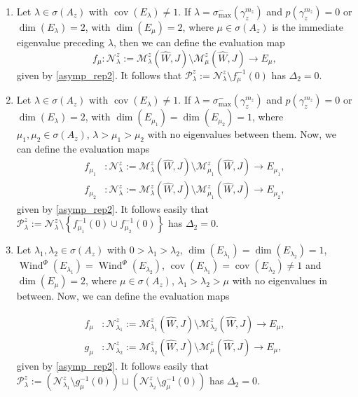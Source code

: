 \documentclass[11pt, a4paper]{amsart}
\newcommand{\cM}{\mathcal{M}}
\newcommand{\cN}{\mathcal{N}}
\newcommand{\cP}{\mathcal{P}}
\DeclareMathOperator{\wind}{Wind}
\DeclareMathOperator{\cov}{cov}
\begin{document}
\begin{enumerate}[topsep=5pt,itemsep=5pt]
    \item Let $\lambda \in \sigma(A_z)$ with $\cov(E_\lambda)\neq 1$. If $\lambda=\sigma_{\max}^{-}(\gamma_z^{m_z})$ and $p(\gamma_z^{m_z})=0$ or $\dim(E_{\lambda})=2$, with $\dim(E_{\mu})=2$, where $\mu \in \sigma(A_z)$ is the immediate eigenvalue preceding $\lambda$, then we can define the evaluation map 
    $$f_\mu :\cN^z_{\lambda}:=\cM^z_{\lambda}(\widehat{W},J) \setminus \cM^z_{\mu}(\widehat{W},J) \rightarrow E_{\mu},$$ given by \cref{asymp_rep2}.  It follows that $\cP^z_{\lambda}:=\cN^z_{\lambda} \setminus f_{\mu}^{-1}(0)$ has $\Delta_2=0$.
    
    \item Let $\lambda \in \sigma(A_z)$ with $\cov(E_\lambda)\neq 1$. If $\lambda=\sigma_{\max}^{-}(\gamma_z^{m_z})$ and $p(\gamma_z^{m_z})=0$ or $\dim(E_{\lambda})=2$, with $\dim(E_{\mu_1})=\dim(E_{\mu_2})=1$, where $\mu_1,\mu_2 \in \sigma(A_z)$, $\lambda>\mu_1>\mu_2$ with no eigenvalues between them.  Now, we can define the evaluation maps 
    \begin{equation*}
        \begin{split}
            f_{\mu_1} &:\cN^z_{\lambda}:=\cM^z_{\lambda}(\widehat{W},J) \setminus \cM^z_{\mu_1}(\widehat{W},J) \rightarrow E_{\mu_1},\\
            f_{\mu_2} &:\cN^z_{\lambda}:=\cM^z_{\lambda}(\widehat{W},J) \setminus \cM^z_{\mu_1}(\widehat{W},J) \rightarrow E_{\mu_2},
        \end{split}
    \end{equation*}
     given by \cref{asymp_rep2}.  It follows easily that $\cP^z_{\lambda}:=\cN^z_{\lambda} \setminus \left\{f_{\mu_1}^{-1}(0)\cup f_{\mu_2}^{-1}(0)\right\}$ has $\Delta_2=0$.
    
    \item Let $\lambda_1,\lambda_2 \in \sigma(A_z)$ with $0>\lambda_1>\lambda_2$, $\dim(E_{\lambda_1})=\dim(E_{\lambda_2})=1$, $\wind^{\Phi}(E_{\lambda_1})=\wind^{\Phi}(E_{\lambda_2})$, $\cov(E_{\lambda_1})=\cov(E_{\lambda_2}) \neq 1$  and $\dim(E_{\mu})=2$, where $\mu \in \sigma(A_z)$, $\lambda_1>\lambda_2>\mu$ with no eigenvalues in between. 
    Now, we can define the evaluation maps 

    \begin{equation*}
        \begin{split}
            f_\mu &:\cN^z_{\lambda_1}:=\cM^z_{\lambda_1}(\widehat{W},J) \setminus \cM^z_{\lambda_2}(\widehat{W},J) \rightarrow E_{\mu},\\
            g_\mu &:\cN^z_{\lambda_2}:=\cM^z_{\lambda_2}(\widehat{W},J) \setminus \cM^z_{\mu}(\widehat{W},J) \rightarrow E_{\mu},
        \end{split}
    \end{equation*}
     given by \cref{asymp_rep2}.  It follows easily that $\cP^z_{\lambda}:=\left(\cN^z_{\lambda_1} \setminus g_{\mu}^{-1}(0)\right)\sqcup \left(\cN^z_{\lambda_2} \setminus g_{\mu}^{-1}(0)\right)$ has $\Delta_2=0$.
    

\end{enumerate}
\end{document}
